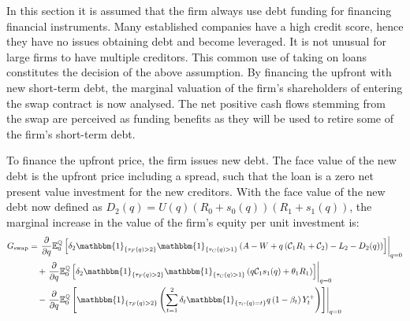 \documentclass[main.tex]{subfiles}
\begin{document}
        In this section it is assumed that the firm always use debt funding for financing financial instruments.
        Many established companies have a high credit score,
        hence they have no issues obtaining debt and become leveraged.
        It is not unusual for large firms to have multiple creditors.
        This common use of taking on loans constitutes the decision of the above assumption.
        By financing the upfront with new short-term debt, the marginal valuation of the firm's shareholders of entering the swap contract is now analysed.
        The net positive cash flows stemming from the swap are perceived as funding benefits as they will be used to retire some of the firm's short-term debt.
        
        To finance the upfront price, the firm issues new debt.
        The face value of the new debt is the upfront price including a spread, 
        such that the loan is a zero net present value investment for the new creditors.
        With the face value of the new debt now defined as $D_{2}(q) = U(q)(R_{0} + s_{0}(q))(R_{1} + s_{1}(q))$,
        the marginal increase in the value of the firm's equity per unit investment is:
        \begin{align}
            G_{\text{swap}} &=
            \left.\frac{\partial}{\partial q}
            \mathbb{E}_{0}^{\rnmeasure}\left[
                \delta_{2} \mathbbm{1}_{\{\tau_{F}(q)>2\}} \mathbbm{1}_{\{\tau_{C}(q)>1\}}
                \left(
                    A - W
                    + q\left(\mathcal{C}_{1} R_{1} + \mathcal{C}_{2}\right)
                    - L_{2}
                    - D_{2}(q)
                \right)
            \right]\right\rvert_{q=0}
            \nonumber
            \\
            &\quad+
            \left.\frac{\partial}{\partial q}
            \mathbb{E}_{0}^{\rnmeasure}\left[
                \delta_2 \mathbbm{1}_{\{\tau_{F}(q)>2\}} \mathbbm{1}_{\{\tau_{C}(q)>1\}}
                \left(q\mathcal{C}_{1} s_1(q) + \theta_{1}R_{1}\right)
            \right]\right\rvert_{q=0}
            \nonumber
            \\
            &\quad-
            \left.\frac{\partial}{\partial q}
            \mathbb{E}_{0}^{\rnmeasure}\left[
                \mathbbm{1}_{\{\tau_{F}(q)>2\}}
                \left(
                    \sum_{t=1}^{2} \delta_{t} \mathbbm{1}_{\{\tau_{C}(q)=t\}}q\left(1-\beta_t\right)Y_{t}^{+}
                \right)
            \right]\right\rvert_{q=0}
        \end{align}
\end{document}
